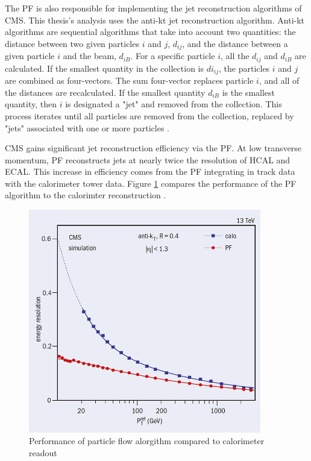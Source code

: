 The PF is also responsible for implementing the jet reconstruction algorithms of CMS. This thesis's analysis uses the anti-kt jet reconstruction algorithm. Anti-kt algorithms are sequential algorithms that take into account two quantities: the distance between two given particles $i$ and $j$, $d_{ij}$, and the distance between a given particle $i$ and the beam, $d_{iB}$. For a specific particle $i$, all the $d_{ij}$ and $d_{iB}$ are calculated. If the smallest quantity in the collection is $di_{ij}$, the particles $i$ and $j$ are combined as four-vectors. The sum four-vector replaces particle $i$, and all of the distances are recalculated. If the smallest quantity $d_{iB}$ is the smallest quantity, then $i$ is designated a "jet" and removed from the collection. This process iterates until all particles are removed from the collection, replaced by "jets" associated with one or more particles \cite{Ellis:1993tq}.

CMS gains significant jet reconstruction efficiency via the PF. At low transverse momentum, PF reconstructs jets at nearly twice the resolution of HCAL and ECAL. This increase in efficiency comes from the PF integrating in track data with the calorimeter tower data. Figure \ref{fig:pfPerf} compares the performance of the PF algorithm to the calorimter reconstruction \cite{Sirunyan:2017ulk}.

\begin{figure}[]
\begin{centering}
\includegraphics[width=4in]{Chapter3/importfigs/CCrec2_05_16.jpg}
\par\end{centering}
\caption{Performance of particle flow alorgithm compared to calorimeter readout \cite{Sirunyan:2017ulk} \label{fig:pfPerf}}
\end{figure}


